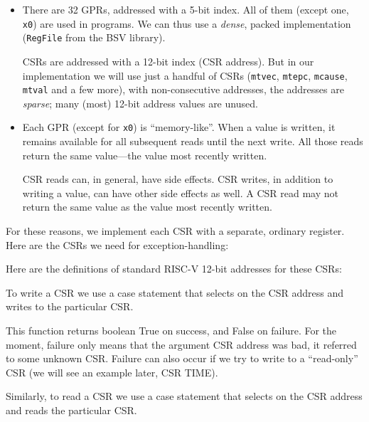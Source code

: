 \begin{itemize}

 \item There are 32 GPRs, addressed with a 5-bit index.  All of them
       (except one, \verb|x0|) are used in programs.  We can thus use
       a \emph{dense}, packed implementation (\verb|RegFile| from the
       BSV library).

       CSRs are addressed with a 12-bit index (CSR address).  But in
       our implementation we will use just a handful of CSRs
       (\verb|mtvec|, \verb|mtepc|, \verb|mcause|, \verb|mtval| and a
       few more), with non-consecutive addresses, {\ie} the addresses
       are \emph{sparse}; many (most) 12-bit address values are
       unused.

 \item Each GPR (except for \verb|x0|) is ``memory-like''.  When a
       value is written, it remains available for all subsequent reads
       until the next write.  All those reads return the same
       value---the value most recently written.

       CSR reads can, in general, have side effects.  CSR writes, in
       addition to writing a value, can have other side effects as
       well.  A CSR read may not return the same value as the value
       most recently written.

\end{itemize}

For these reasons, we implement each CSR with a separate, ordinary
register.  Here are the CSRs we need for exception-handling:



Here are the definitions of standard RISC-V 12-bit addresses for these
CSRs:



To write a CSR we use a case statement that selects on the CSR
address and writes to the particular CSR.



This function returns boolean True on success, and False on failure.
For the moment, failure only means that the argument CSR address was
bad, {\ie} it referred to some unknown CSR.  Failure can also occur if
we try to write to a ``read-only'' CSR (we will see an example later,
CSR TIME).

Similarly, to read a CSR we use a case statement that selects on the
CSR address and reads the particular CSR.

